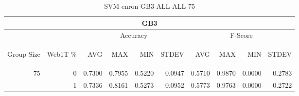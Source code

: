 \begin{center}
\begin{table}[htbp] 
 \begin{center}
\begin{tabular}{ | r | r | r | r | r | r | r | r | r | r |}
\hline
\multicolumn{10}{|c|}{GB3}\\
\hline
 & & \multicolumn{4}{|c|}{Accuracy} & \multicolumn{4}{|c|}{F-Score}\\ \cline{3-10}
\begin{sideways}Group Size\end{sideways} & \begin{sideways}Web1T \%\end{sideways} & \begin{sideways}AVG\end{sideways} & \begin{sideways}MAX\end{sideways} & \begin{sideways}MIN\end{sideways} & \begin{sideways}STDEV\end{sideways} & \begin{sideways}AVG\end{sideways} & \begin{sideways}MAX\end{sideways} & \begin{sideways}MIN\end{sideways} & \begin{sideways}STDEV\end{sideways}\\
\hline
\multirow{1}{*}{75}
 & 0 & 0.7300 & 0.7955 & 0.5220 & 0.0947 & 0.5710 & 0.9870 & 0.0000 & 0.2783\\ \cline{2-10}
 & 1 & 0.7336 & 0.8161 & 0.5273 & 0.0952 & 0.5773 & 0.9763 & 0.0000 & 0.2722\\ \cline{2-10}
\hline
\end{tabular}
\caption{SVM-enron-GB3-ALL-ALL-75}
\label{table:SVM-enron-GB3-ALL-ALL-75}
\end{center}
 \end{table}
\end{center}

